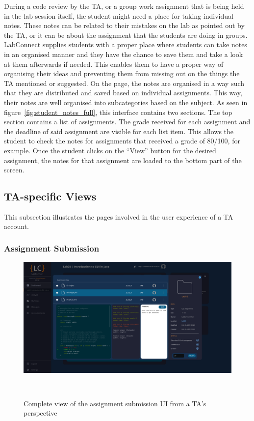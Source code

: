 \documentclass[a4paper, 12pt]{article}
\begin{document}
    During a code review by the TA, or a group work assignment that is being held in the lab session itself,
    the student might need a place for taking individual notes. These notes can be related to their
    mistakes on the lab as pointed out by the TA, or it can be about the assignment that the
    students are doing in groups. LabConnect supplies students with a proper place where students
    can take notes in an organised manner and they have the chance to save them and take a look
    at them afterwards if needed. This enables them to have a proper way of organising their ideas
    and preventing them from missing out on the things the TA mentioned or suggested. On the
    page, the notes are organised in a way such that they are distributed and saved based on individual
    assignments. This way, their notes are well organised into subcategories
    based on the subject. As seen in figure~\ref{fig:student_notes_full}, this interface contains
    two sections. The top section contains a list of assignments. The grade received for each
    assignment and the deadline of said assignment are visible for each list item. This allows the
    student to check the notes for assignments that received a grade of 80/100, for example. Once
    the student clicks on the ``View'' button for the desired assignment, the notes for that assignment
    are loaded to the bottom part of the screen.

    \pagebreak


    \subsection{TA-specific Views}

    This subsection illustrates the pages involved in the user experience of a TA account.

    \subsubsection{Assignment Submission}

    \begin{figure}[H]
        \centering
        \includegraphics[width=\textwidth]{ta_assignment_submission}
        \caption{Complete view of the assignment submission UI from a TA's perspective}~\label{fig:ta_assignment_submission_full}
    \end{figure}
\end{document}
